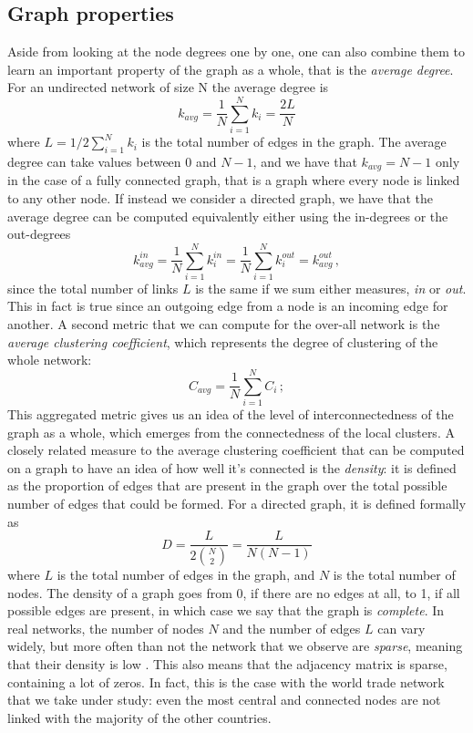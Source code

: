 \subsection{Graph properties}
Aside from looking at the node degrees one by one, one can also combine them to learn an important property of the graph as a whole, that is the \textit{average degree}. For an undirected network of size N the average degree is 
\[
    k_{avg} = \frac{1}{N}\sum_{i=1}^N k_i = \frac{2 L }{N} 
\]
where $L = 1/2 \sum_{i=1}^N k_i$ is the total number of edges in the graph. The average degree can take values between $0$ and $N-1$, and we have that $k_{avg} = N-1$ only in the case of a fully connected graph, that is a graph where every node is linked to any other node.
If instead we consider a directed graph, we have that the average degree can be computed equivalently either using the in-degrees or the out-degrees
\[
    k_{avg}^{in} = \frac{1}{N} \sum_{i=1}^N k_i^{in} = \frac{1}{N} \sum_{i=1}^N k_i^{out} = k_{avg}^{out}\,,
\]
since the total number of links $L$ is the same if we sum either measures, \textit{in} or \textit{out}. This in fact is true since an outgoing edge from a node is an incoming edge for another.
A second metric that we can compute for the over-all network is the \textit{average clustering coefficient}, which represents the degree of clustering of the whole network:
\[
    C_{avg} = \frac{1}{N} \sum_{i=1}^N C_i \,;
\]
This aggregated metric gives us an idea of the level of interconnectedness of the graph as a whole, which emerges from the connectedness of the local clusters. 
A closely related measure to the average clustering coefficient that can be computed on a graph to have an idea of how well it's connected is the \textit{density}: it is defined as the proportion of edges that are present in the graph over the total possible number of edges that could be formed. 
For a directed graph, it is defined formally as
\[
    D = \frac{L}{2\binom{N}{2}} = \frac{L}{N(N-1)}
\]
where $L$ is the total number of edges in the graph, and $N$ is the total number of nodes. The density of a graph goes from 0, if there are no edges at all, to 1, if all possible edges are present, in which case we say that the graph is \textit{complete}. In real networks, the number of nodes $N$ and the number of edges $L$ can vary widely, but more often than not the network that we observe are \textit{sparse}, meaning that their density is low \cite{barabasi2016network}. This also means that the adjacency matrix is sparse, containing a lot of zeros. In fact, this is the case with the world trade network that we take under study: even the most central and connected nodes are not linked with the majority of the other countries.


